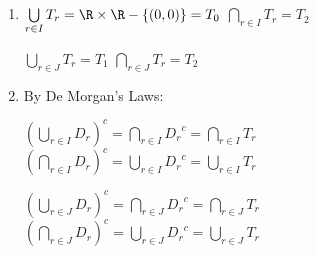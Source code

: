 \begin{enumerate}
\begin{enumerate}
\item $\bigcup\limits_{r \in I}^{}T_r = \R \times \R - \left\{ \left( 0, 0 \right) \right\} = T_0$ \qquad 
$\bigcap\limits_{r \in I}^{}T_r = T_2$

$\bigcup\limits_{r \in J}^{}T_r = T_1$ \qquad 
$\bigcap\limits_{r \in J}^{}T_r = T_2$


\item By De Morgan's Laws:

$\left( \bigcup\limits_{r \in I}^{}D_r \right)^c = \bigcap\limits_{r \in I}^{}{D_r}^c = \bigcap\limits_{r \in I}^{}T_r$ \\
$\left( \bigcap\limits_{r \in I}^{}D_r \right)^c = \bigcup\limits_{r \in I}^{}{D_r}^c = \bigcup\limits_{r \in I}^{}T_r$

$\left( \bigcup\limits_{r \in J}^{}D_r \right)^c = \bigcap\limits_{r \in J}^{}{D_r}^c = \bigcap\limits_{r \in J}^{}T_r$ \\
$\left( \bigcap\limits_{r \in J}^{}D_r \right)^c = \bigcup\limits_{r \in J}^{}{D_r}^c = \bigcup\limits_{r \in J}^{}T_r$
\end{enumerate}

\end{enumerate}

\hbreak
\endinput


\item We first rewrite the set difference.
\begin{align*}
\left(\:\bigcap\limits_{\alpha \in \Lambda}^{}A_{\alpha} \right) - B 
            &= \left(\:\bigcap\limits_{\alpha \in \Lambda}^{}A_{\alpha} \right) \cap B^c \\
            &= \bigcap\limits_{\alpha \in \Lambda}^{}\left( A_\alpha \cap B^c \right) \\
            &=\bigcap\limits_{\alpha \in \Lambda}^{} \left( A_{\alpha} - B \right) \\
\end{align*}

